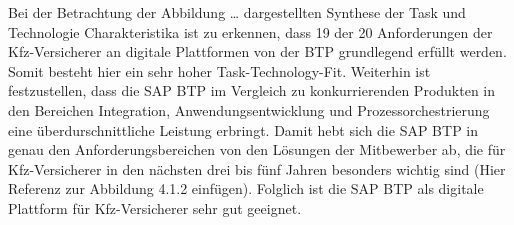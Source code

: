\FloatBarrier


Bei der Betrachtung der Abbildung … dargestellten Synthese der Task und Technologie Charakteristika ist zu erkennen, dass 19 der 20  Anforderungen der Kfz-Versicherer an digitale Plattformen von der BTP grundlegend erfüllt werden. Somit besteht hier ein sehr hoher Task-Technology-Fit. Weiterhin ist festzustellen, dass die SAP BTP im Vergleich zu konkurrierenden Produkten in den Bereichen Integration, Anwendungsentwicklung und Prozessorchestrierung eine überdurschnittliche Leistung erbringt. Damit hebt sich die SAP BTP in genau den Anforderungsbereichen von den Lösungen der Mitbewerber ab, die für Kfz-Versicherer in den nächsten drei bis fünf Jahren besonders wichtig sind (Hier Referenz zur Abbildung 4.1.2 einfügen). Folglich ist die SAP BTP als digitale Plattform für Kfz-Versicherer sehr gut geeignet.




\newpage